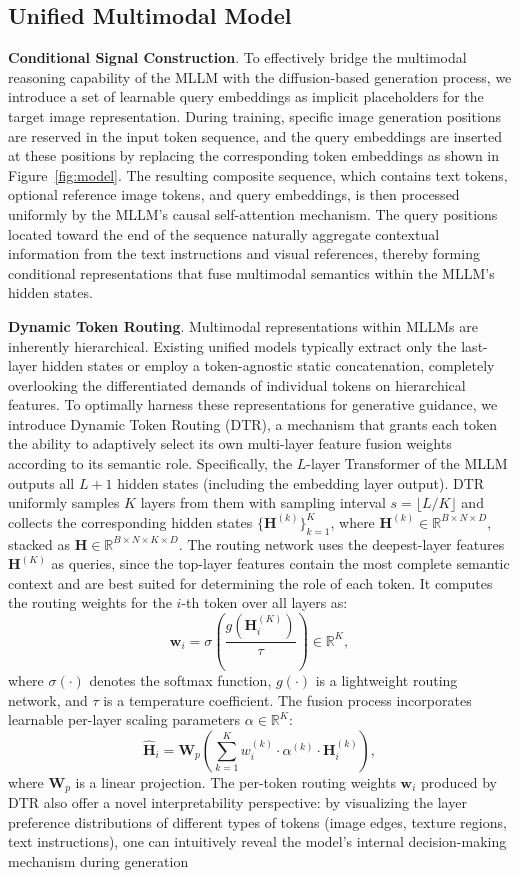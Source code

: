 \documentclass[runningheads]{llncs}
\begin{document}
\subsection{Unified Multimodal Model}
\textbf{Conditional Signal Construction}.
To effectively bridge the multimodal reasoning capability of the MLLM with the diffusion-based generation process, we introduce a set of learnable query embeddings as implicit placeholders for the target image representation.
During training, specific image generation positions are reserved in the input token sequence, and the query embeddings are inserted at these positions by replacing the corresponding token embeddings as shown in Figure~\ref{fig:model}. The resulting composite sequence, which contains text tokens, optional reference image tokens, and query embeddings, is then processed uniformly by the MLLM's causal self-attention mechanism. The query positions located toward the end of the sequence naturally aggregate contextual information from the text instructions and visual references, thereby forming conditional representations that fuse multimodal semantics within the MLLM's hidden states.

\noindent\textbf{Dynamic Token Routing}. 
Multimodal representations within MLLMs are inherently hierarchical. Existing unified models typically extract only the last-layer hidden states or employ a token-agnostic static concatenation, completely overlooking the differentiated demands of individual tokens on hierarchical features.
To optimally harness these representations for generative guidance, we introduce Dynamic Token Routing (DTR), a mechanism that grants each token the ability to adaptively select its own multi-layer feature fusion weights according to its semantic role. Specifically, the $L$-layer Transformer of the MLLM outputs all $L+1$ hidden states (including the embedding layer output). DTR uniformly samples $K$ layers from them with sampling interval $s = \lfloor L / K \rfloor$ and collects the corresponding hidden states $\{\mathbf{H}^{(k)}\}_{k=1}^{K}$, where $\mathbf{H}^{(k)} \in \mathbb{R}^{B \times N \times D}$, stacked as $\mathbf{H} \in \mathbb{R}^{B \times N \times K \times D}$.
The routing network uses the deepest-layer features $\mathbf{H}^{(K)}$ as queries, since the top-layer features contain the most complete semantic context and are best suited for determining the role of each token. It computes the routing weights for the $i$-th token over all layers as:
$$\mathbf{w}_i = \sigma\left(\frac{g(\mathbf{H}^{(K)}_i)}{\tau}\right) \in \mathbb{R}^{K},$$
where $\sigma(\cdot)$ denotes the softmax function, $g(\cdot)$ is a lightweight routing network, and $\tau$ is a temperature coefficient. The fusion process incorporates learnable per-layer scaling parameters ${\alpha} \in \mathbb{R}^{K}$:
$$\hat{\mathbf{H}}_i = \mathbf{W}_p \left(\sum_{k=1}^{K} w_i^{(k)} \cdot \alpha^{(k)} \cdot \mathbf{H}_i^{(k)}\right),$$
where $\mathbf{W}_p$ is a linear projection.
The per-token routing weights $\mathbf{w}_i$ produced by DTR also offer a novel interpretability perspective: by visualizing the layer preference distributions of different types of tokens (image edges, texture regions, text instructions), one can intuitively reveal the model's internal decision-making mechanism during generation
\end{document}
